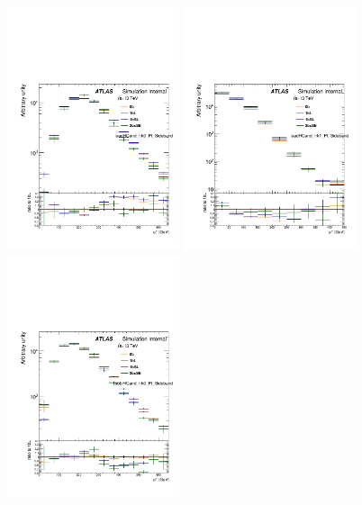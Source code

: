 \begin{figure}[htbp!]
\begin{center}
\includegraphics[angle=270, width=0.45\textwidth]{./figures/boosted/AppendixDijetMC/leadHCand_trk0_Pt_SidebandwoPr_log.pdf}
\includegraphics[angle=270, width=0.45\textwidth]{./figures/boosted/AppendixDijetMC/leadHCand_trk1_Pt_SidebandwoPr_log.pdf}
\includegraphics[angle=270, width=0.45\textwidth]{./figures/boosted/AppendixDijetMC/sublHCand_trk0_Pt_SidebandwoPr_log.pdf}

\end{center}
\end{figure}
